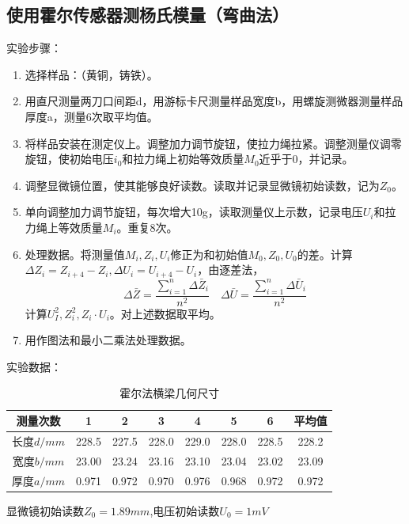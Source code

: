 \documentclass[11pt]{article}
\newcommand{\others}{$\square$}
\newcommand{\othersYes}{$\square$\hspace{-1em}$\surd$}
\begin{document}
\subsection{使用霍尔传感器测杨氏模量（弯曲法）}
\noindent 实验步骤：
\begin{enumerate}
    \item 选择样品：（黄铜\makebox[3em][c]{\others}，铸铁\makebox[3em][c]{\othersYes}）。
    \item 用直尺测量两刀口间距d，用游标卡尺测量样品宽度b，用螺旋测微器测量样品厚度a，测量6次取平均值。
    \item 将样品安装在测定仪上。调整加力调节旋钮，使拉力绳拉紧。调整测量仪调零旋钮，使初始电压$i_0$和拉力绳上初始等效质量$M_0$近乎于0，并记录。
    \item 调整显微镜位置，使其能够良好读数。读取并记录显微镜初始读数，记为$Z_0$。
    \item 单向调整加力调节旋钮，每次增大10g，读取测量仪上示数，记录电压$U_i$和拉力绳上等效质量$M_i$。重复8次。
    \item 处理数据。将测量值$M_i,Z_i,U_i$修正为和初始值$M_0,Z_0,U_0$的差。计算$\Delta Z_i=Z_{i+4}-Z_i,\Delta U_i=U_{i+4}-U_i$，由逐差法，
    \[\Delta \bar{Z}=\frac{\sum_{i = 1}^{n} \Delta \bar{Z}_i }{n^2} \quad \Delta \bar{U}=\frac{\sum_{i = 1}^{n} \Delta \bar{U}_i }{n^2}\]
    计算$U_I^2,Z_i^2,Z_i \cdot U_i$。对上述数据取平均。
    \item 用作图法和最小二乘法处理数据。
\end{enumerate}
\noindent 实验数据：
\begin{table}[H]
    \centering
    \caption{霍尔法横梁几何尺寸}
    \begin{tabular}{|c|c|c|c|c|c|c|c|}
    \hline
        测量次数 & 1 & 2 & 3 & 4 & 5 & 6 & 平均值 \\ \hline
        长度$d/mm$ & 228.5  & 227.5  & 228.0  & 229.0  & 228.0  & 228.5  & 228.2  \\ \hline
        宽度$b/mm$ & 23.00  & 23.24  & 23.16  & 23.10  & 23.04  & 23.02  & 23.09  \\ \hline
        厚度$a/mm$ & 0.971  & 0.972  & 0.970  & 0.976  & 0.968  & 0.972  & 0.972 \\ \hline
    \end{tabular}
\end{table}
\par \hspace*{2em} 显微镜初始读数$Z_0=1.89mm$,电压初始读数$U_0=1mV$
\end{document}
